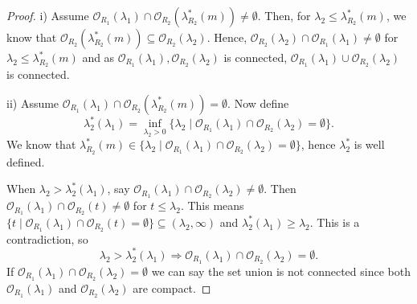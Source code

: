 \documentclass{article}
\begin{document}
\begin{proof}
i) Assume $\mathcal{O}_{R_1}(\lambda_1) \cap \mathcal{O}_{R_2}(\lambda_{R_2}^*(m)) \neq \emptyset$. Then, for $\lambda_2 \leq \lambda_{R_2}^*(m)$, we know that $\mathcal{O}_{R_2}(\lambda_{R_2}^*(m)) \subseteq \mathcal{O}_{R_2}(\lambda_2)$. Hence, $\mathcal{O}_{R_2}(\lambda_2) \cap \mathcal{O}_{R_1}(\lambda_1) \neq \emptyset$ for $\lambda_2 \leq \lambda_{R_2}^*(m)$ and as $\mathcal{O}_{R_1}(\lambda_1), \mathcal{O}_{R_2}(\lambda_2)$ is connected, $\mathcal{O}_{R_1}(\lambda_1) \cup \mathcal{O}_{R_2}(\lambda_2)$ is connected.

ii) Assume $\mathcal{O}_{R_1}(\lambda_1) \cap \mathcal{O}_{R_2}(\lambda_{R_2}^*(m)) = \emptyset$. Now define
\[
\lambda_2^*(\lambda_1) = \inf_{\lambda_2 > 0} \{ \lambda_2 \mid \mathcal{O}_{R_1}(\lambda_1) \cap \mathcal{O}_{R_2}(\lambda_2) = \emptyset \}.
\]
We know that $\lambda_{R_2}^*(m) \in \{ \lambda_2 \mid \mathcal{O}_{R_1}(\lambda_1) \cap \mathcal{O}_{R_2}(\lambda_2) = \emptyset \}$, hence $\lambda_2^*$ is well defined. 

When $\lambda_2 > \lambda_2^*(\lambda_1)$, say $\mathcal{O}_{R_1}(\lambda_1) \cap \mathcal{O}_{R_2}(\lambda_2) \neq \emptyset.$ Then $ \mathcal{O}_{R_1}(\lambda_1) \cap \mathcal{O}_{R_2}(t) \neq \emptyset$ for $t \leq \lambda_2$. This means $\{ t \mid \mathcal{O}_{R_1}(\lambda_1) \cap \mathcal{O}_{R_2}(t) = \emptyset \} \subseteq (\lambda_2, \infty)$ and $\lambda^{*}_2(\lambda_1)\geq \lambda_2$. This is a contradiction, so 
\[\lambda_2 > \lambda_2^*(\lambda_1) \Rightarrow \mathcal{O}_{R_1}(\lambda_1) \cap \mathcal{O}_{R_2}(\lambda_2) = \emptyset.
\] 
If $\mathcal{O}_{R_1}(\lambda_1) \cap \mathcal{O}_{R_2}(\lambda_2) = \emptyset$ we can say the set union is not connected since both $\mathcal{O}_{R_1}(\lambda_1)$ and $\mathcal{O}_{R_2}(\lambda_2)$ are compact.


\end{proof}
\end{document}
